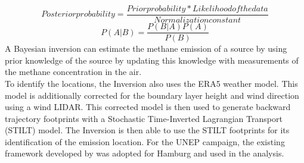 \begin{equation}
Posterior probability = \frac{Prior probability * Likelihood of the data}{Normalization constant}
\end{equation}
\begin{equation}
P(A|B) = \frac{P(B|A)P(A)}{P(B)}
\end{equation}
A Bayesian inversion can estimate the methane emission of a source by using prior knowledge of the source by updating this knowledge with measurements of the methane concentration in the air.\\
To identify the locations, the Inversion also uses the ERA5 weather model. This model is additionally corrected for the boundary layer height and wind direction using a wind LIDAR. This corrected model is then used to generate backward trajectory footprints with a Stochastic Time-Inverted Lagrangian Transport (STILT) model. The Inversion is then able to use the STILT footprints for its identification of the emission location. For the UNEP campaign, the existing framework developed by \cite{Jones.2021} was adopted for Hamburg and used in the analysis.

